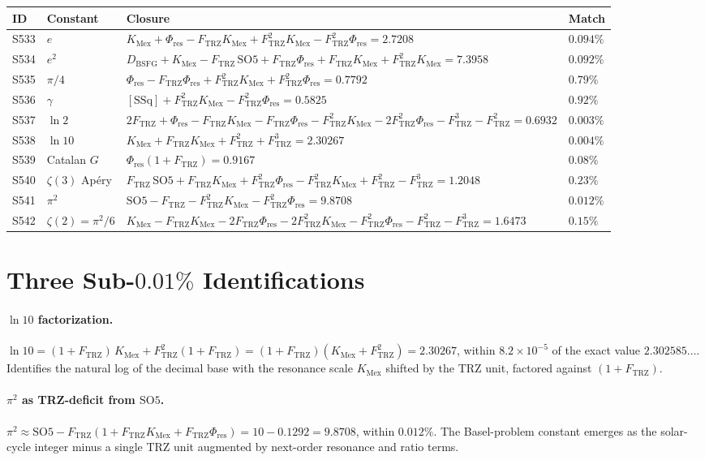 \documentclass[11pt]{article}
\newcommand{\Ftrz}{F_{\mathrm{TRZ}}}
\newcommand{\Phires}{\Phi_{\mathrm{res}}}
\newcommand{\KMex}{K_{\mathrm{Mex}}}
\newcommand{\Dbsfg}{D_{\mathrm{BSFG}}}
\newcommand{\SOfive}{\mathrm{SO5}}
\newcommand{\SSq}{[\mathrm{SSq}]}
\begin{document}
\begin{longtable}{@{}llll@{}}
\toprule
ID & Constant & Closure & Match \\
\midrule
\endhead
S533 & $e$ & $\KMex+\Phires-\Ftrz\KMex+\Ftrz^2\KMex-\Ftrz^2\Phires=2.7208$ & $0.094\%$ \\
S534 & $e^2$ & $\Dbsfg+\KMex-\Ftrz\,\SOfive+\Ftrz\Phires+\Ftrz\KMex+\Ftrz^2\KMex=7.3958$ & $0.092\%$ \\
S535 & $\pi/4$ & $\Phires-\Ftrz\Phires+\Ftrz^2\KMex+\Ftrz^2\Phires=0.7792$ & $0.79\%$ \\
S536 & $\gamma$ & $\SSq+\Ftrz^2\KMex-\Ftrz^2\Phires=0.5825$ & $0.92\%$ \\
S537 & $\ln 2$ & $2\Ftrz+\Phires-\Ftrz\KMex-\Ftrz\Phires-\Ftrz^2\KMex-2\Ftrz^2\Phires-\Ftrz^3-\Ftrz^2=0.6932$ & $\mathbf{0.003\%}$ \\
S538 & $\ln 10$ & $\KMex+\Ftrz\KMex+\Ftrz^2+\Ftrz^3=2.30267$ & $\mathbf{0.004\%}$ \\
S539 & Catalan $G$ & $\Phires(1+\Ftrz)=0.9167$ & $0.08\%$ \\
S540 & $\zeta(3)$ Ap\'ery & $\Ftrz\,\SOfive+\Ftrz\KMex+\Ftrz^2\Phires-\Ftrz^2\KMex+\Ftrz^2-\Ftrz^3=1.2048$ & $0.23\%$ \\
S541 & $\pi^2$ & $\SOfive-\Ftrz-\Ftrz^2\KMex-\Ftrz^2\Phires=9.8708$ & $\mathbf{0.012\%}$ \\
S542 & $\zeta(2)=\pi^2/6$ & $\KMex-\Ftrz\KMex-2\Ftrz\Phires-2\Ftrz^2\KMex-\Ftrz^2\Phires-\Ftrz^2-\Ftrz^3=1.6473$ & $0.15\%$ \\
\bottomrule
\end{longtable}

\section{Three Sub-$0.01\%$ Identifications}

\paragraph{$\ln 10$ factorization.}
$\ln 10 = (1+\Ftrz)\,\KMex + \Ftrz^2(1+\Ftrz) = (1+\Ftrz)(\KMex+\Ftrz^2) = 2.30267$,
within $8.2\times 10^{-5}$ of the exact value $2.302585\ldots$.
Identifies the natural log of the decimal base with the resonance scale
$\KMex$ shifted by the TRZ unit, factored against $(1+\Ftrz)$.

\paragraph{$\pi^2$ as TRZ-deficit from $\SOfive$.}
$\pi^2 \approx \SOfive - \Ftrz(1+\Ftrz\KMex+\Ftrz\Phires)
       = 10-0.1292 = 9.8708$, within $0.012\%$.
The Basel-problem constant emerges as the solar-cycle integer minus a
single TRZ unit augmented by next-order resonance and ratio terms.
\end{document}
